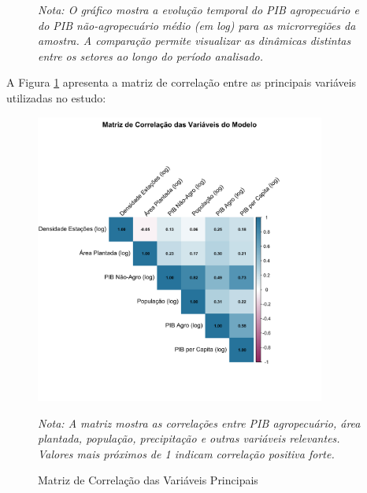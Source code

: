 \documentclass[
	12pt,				%
	oneside,			%
	a4paper,			%
	english,			%
	french,				%
	spanish,			%
	brazil				%
	]{abntex2}
\begin{document}
\begin{apendicesenv}
\begin{figure}[h]
\textit{Nota: O gráfico mostra a evolução temporal do PIB agropecuário e do PIB não-agropecuário médio (em log) para as microrregiões da amostra. A comparação permite visualizar as dinâmicas distintas entre os setores ao longo do período analisado.}
\end{figure}

A Figura \ref{fig:correlacao} apresenta a matriz de correlação entre as principais variáveis utilizadas no estudo:

\begin{figure}[h]
\centering
\caption{Matriz de Correlação das Variáveis Principais}
\label{fig:correlacao}
\includegraphics[width=0.85\textwidth]{../../../data/outputs/descriptive_analysis/matriz_correlacao.png}

\textit{Nota: A matriz mostra as correlações entre PIB agropecuário, área plantada, população, precipitação e outras variáveis relevantes. Valores mais próximos de 1 indicam correlação positiva forte.}
\end{figure}


\end{apendicesenv}

\printindex
\end{document}
